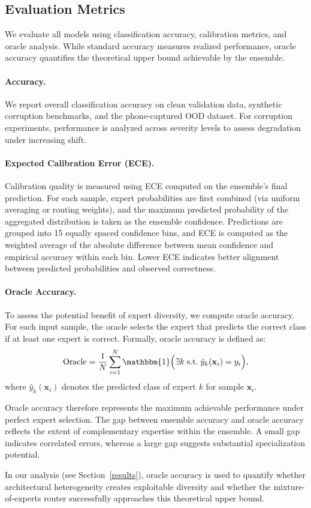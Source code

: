 \subsection{Evaluation Metrics}

We evaluate all models using classification accuracy, calibration metrics, and oracle analysis.
While standard accuracy measures realized performance, oracle accuracy quantifies the theoretical upper bound achievable by the ensemble.

\paragraph{Accuracy.}
We report overall classification accuracy on clean validation data, synthetic corruption benchmarks, and the phone-captured OOD dataset.
For corruption experiments, performance is analyzed across severity levels to assess degradation under increasing shift.

\paragraph{Expected Calibration Error (ECE).} 
Calibration quality is measured using ECE \citep{pmlr-v70-guo17a} computed on the ensemble's final prediction.
For each sample, expert probabilities are first combined (via uniform averaging or routing weights), and the maximum predicted probability of the aggregated distribution is taken as the ensemble confidence.
Predictions are grouped into 15 equally spaced confidence bins, and ECE is computed as the weighted average of the absolute difference between mean confidence and empirical accuracy within each bin.
Lower ECE indicates better alignment between predicted probabilities and observed correctness.

\paragraph{Oracle Accuracy.}
To assess the potential benefit of expert diversity, we compute oracle accuracy.
For each input sample, the oracle selects the expert that predicts the correct class if at least one expert is correct.
Formally, oracle accuracy is defined as:
\[
\text{Oracle} = \frac{1}{N} \sum_{i=1}^{N} \mathbbm{1} \Bigl( \exists k \; \text{s.t.} \; \hat{y}_k(\mathbf{x}_i) = y_i \Bigr),
\]
where $\hat{y}_k(\mathbf{x}_i)$ denotes the predicted class of expert $k$ for sample $\mathbf{x}_i$.

Oracle accuracy therefore represents the maximum achievable performance under perfect expert selection.
The gap between ensemble accuracy and oracle accuracy reflects the extent of complementary expertise within the ensemble.
A small gap indicates correlated errors, whereas a large gap suggests substantial specialization potential.

In our analysis (see Section~\ref{results}), oracle accuracy is used to quantify whether architectural heterogeneity creates exploitable diversity and whether the mixture-of-experts router successfully approaches this theoretical upper bound.